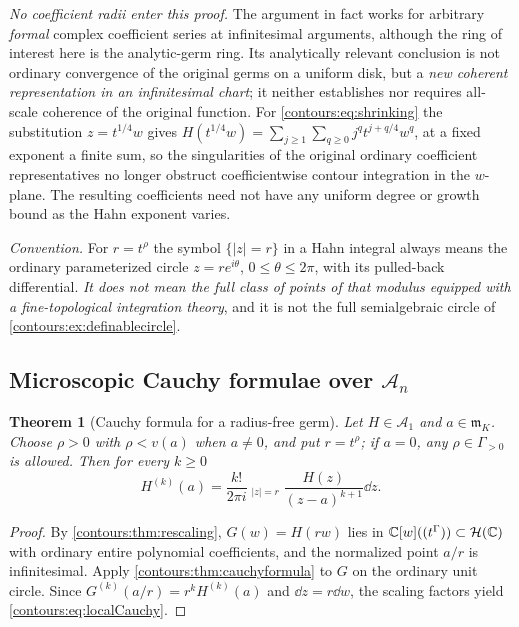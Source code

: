 \documentclass[11pt,letterpaper]{article}
\newtheorem{theorem}{Theorem}[section]
\theoremstyle{definition}
\theoremstyle{remark}
\newcommand{\HH}{\mathcal H}\newcommand{\A}{\mathscr A}\newcommand{\OO}{\mathcal O}
\newcommand{\m}{\mathfrak m}\newcommand{\st}{\operatorname{st}}
\newcommand{\HCoint}{\mathop{\oint^{\!H}}\nolimits}
\numberwithin{equation}{section}
\begin{document}
\emph{No coefficient radii enter this proof.} The argument in fact works for
arbitrary \emph{formal} complex coefficient series at infinitesimal arguments,
although the ring of interest here is the analytic-germ ring. Its analytically
relevant conclusion is not ordinary convergence of the original germs on a uniform
disk, but a \emph{new coherent representation in an infinitesimal chart}; it
neither establishes nor requires all-scale coherence of the original function. For
\eqref{contours:eq:shrinking} the substitution $z=t^{1/4}w$ gives
$H(t^{1/4}w)=\sum_{j\ge1}\sum_{q\ge0}j^qt^{j+q/4}w^q$, at a fixed exponent a finite
sum, so the singularities of the original ordinary coefficient representatives no
longer obstruct coefficientwise contour integration in the $w$-plane. The resulting
coefficients need not have any uniform degree or growth bound as the Hahn exponent
varies.

\emph{Convention.} For $r=t^\rho$ the symbol $\{|z|=r\}$ in a Hahn integral always
means the ordinary parameterized circle $z=re^{i\theta}$, $0\le\theta\le2\pi$, with
its pulled-back differential. \emph{It does not mean the full class of points of
that modulus equipped with a fine-topological integration theory}, and it is not the
full semialgebraic circle of \cref{contours:ex:definablecircle}.

\subsection{\texorpdfstring{Microscopic Cauchy formulae over $\A_n$}%
{Microscopic Cauchy formulae over the radius-free ring}}
\begin{theorem}[Cauchy formula for a radius-free germ]
\label{contours:thm:localcauchy}
Let $H\in\A_1$ and $a\in\m_K$. Choose $\rho>0$ with $\rho<v(a)$ when $a\ne0$, and
put $r=t^\rho$; if $a=0$, any $\rho\in\Gamma_{>0}$ is allowed. Then for every
$k\ge0$
\begin{equation}\label{contours:eq:localCauchy}
 \boxed{\quad
 H^{(k)}(a)=\frac{k!}{2\pi i}\HCoint_{|z|=r}
 \frac{H(z)}{(z-a)^{k+1}}\dd z .
 \quad}
\end{equation}
\end{theorem}
\begin{proof}
By \cref{contours:thm:rescaling}, $G(w)=H(rw)$ lies in $\C[w]((t^\Gamma))\subset
\HH(\C)$ with ordinary entire polynomial coefficients, and the normalized point
$a/r$ is infinitesimal. Apply \cref{contours:thm:cauchyformula} to $G$ on the
ordinary unit circle. Since $G^{(k)}(a/r)=r^kH^{(k)}(a)$ and $\dd z=r\dd w$, the
scaling factors yield \eqref{contours:eq:localCauchy}.
\end{proof}
\end{document}

